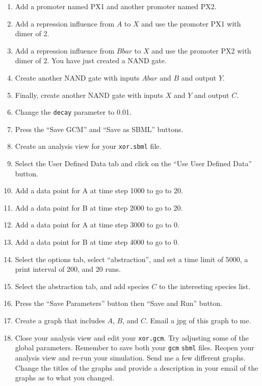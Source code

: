 \documentclass[titlepage,11pt]{article}
\begin{document}
\begin{enumerate}
\item Add a promoter named PX1 and another promoter named PX2.

\item Add a repression influence from $A$ to $X$ and use the promoter 
      PX1 with dimer of 2.

\item Add a repression influence from $Bbar$ to $X$ and use the promoter 
      PX2 with dimer of 2.  You have just created a NAND gate.

\item Create another NAND gate with inputs $Abar$ and $B$ and output $Y$.

\item Finally, create another NAND gate with inputs $X$ and $Y$ and 
      output $C$.

\item Change the {\tt decay} parameter to 0.01.

\item Press the ``Save GCM'' and ``Save as SBML'' buttons.

\item Create an analysis view for your {\tt xor.sbml} file.

\item Select the User Defined Data tab and click on the 
      ``Use User Defined Data'' button.

\item Add a data point for A at time step 1000 to go to 20.

\item Add a data point for B at time step 2000 to go to 20.

\item Add a data point for A at time step 3000 to go to 0.

\item Add a data point for B at time step 4000 to go to 0.

\item Select the options tab, select ``abstraction'', and 
      set a time limit of 5000, a print interval of 200, and 20 runs.  

\item Select the abstraction tab, and add species $C$ to the interesting 
      species list.

\item Press the ``Save Parameters'' button then ``Save and Run'' button.

\item Create a graph that includes $A$, $B$, and $C$.  Email a jpg
      of this graph to me.

\item Close your analysis view and edit your {\tt xor.gcm}.  Try adjusting
      some of the global parameters.  Remember to save both your {\tt gcm}
      {\tt sbml} files.  Reopen your analysis view and re-run your simulation.
      Send me a few different graphs.  Change the titles of the graphs 
      and provide a description in your email of the graphs as to what you
      changed.
\end{enumerate}
\end{document}
